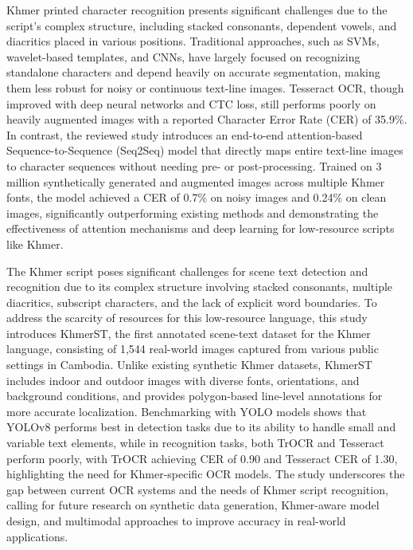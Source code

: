 \citet{Buoy2022} Khmer printed character recognition presents significant 
challenges due to the script's complex structure, including stacked consonants, 
dependent vowels, and diacritics placed in various positions. Traditional approaches, 
such as SVMs, wavelet-based templates, and CNNs, have largely focused on recognizing standalone 
characters and depend heavily on accurate segmentation, making them less robust for noisy or 
continuous text-line images. Tesseract OCR, though improved with deep neural networks 
and CTC loss, still performs poorly on heavily augmented images with a reported Character 
Error Rate (CER) of 35.9\%. In contrast, the reviewed study introduces an end-to-end 
attention-based Sequence-to-Sequence (Seq2Seq) model that directly maps entire text-line 
images to character sequences without needing pre- or post-processing. Trained on 3 million 
synthetically generated and augmented images across multiple Khmer fonts, the model 
achieved a CER of 0.7\% on noisy images and 0.24\% on clean images, significantly 
outperforming existing methods and demonstrating the effectiveness of attention mechanisms 
and deep learning for low-resource scripts like Khmer.

\citet{nom2024khmerst} The Khmer script poses significant challenges for scene text detection 
and recognition due to its complex structure involving stacked consonants, multiple diacritics, 
subscript characters, and the lack of explicit word boundaries. To address the scarcity of 
resources for this low-resource language, this study introduces KhmerST, the first annotated 
scene-text dataset for the Khmer language, consisting of 1,544 real-world images captured 
from various public settings in Cambodia. Unlike existing synthetic Khmer datasets, 
KhmerST includes indoor and outdoor images with diverse fonts, orientations, and 
background conditions, and provides polygon-based line-level annotations for more accurate 
localization. Benchmarking with YOLO models shows that YOLOv8 performs best in detection 
tasks due to its ability to handle small and variable text elements, while in recognition 
tasks, both TrOCR and Tesseract perform poorly, with TrOCR achieving CER of 0.90 and 
Tesseract CER of 1.30, highlighting the need for Khmer-specific OCR models. The study 
underscores the gap between current OCR systems and the needs of Khmer script recognition, 
calling for future research on synthetic data generation, Khmer-aware model design, 
and multimodal approaches to improve accuracy in real-world applications.

